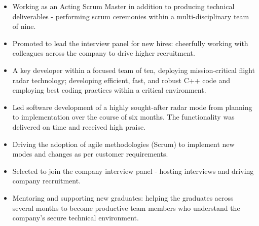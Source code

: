 \documentclass[8pt,a4paper]{altacv}
\begin{document}

\begin{fullwidth}
\makecvheader
\end{fullwidth}

\begin{itemize}

\item Working as an Acting Scrum Master in addition to producing technical deliverables - performing scrum ceremonies within a multi-disciplinary team of nine.
\item Promoted to lead the interview panel for new hires: cheerfully working with colleagues across the company to drive higher recruitment.

\divider
\end{itemize}

\begin{itemize}

\item A key developer within a focused team of ten, deploying mission-critical flight radar technology; developing efficient, fast, and robust C++ code and employing best coding practices within a critical environment. 
\item Led software development of a highly sought-after radar mode from planning to implementation over the course of six months. The functionality was delivered on time and received high praise. 
\item Driving the adoption of agile methodologies (Scrum) to implement new modes and changes as per customer requirements.
\item Selected to join the company interview panel - hosting interviews and driving company recruitment.
\item Mentoring and supporting new graduates: helping the graduates across several months to become productive team members who understand the company's secure technical environment.

\divider
\end{itemize}
\end{document}
